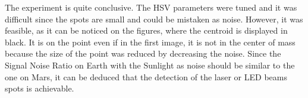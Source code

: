The experiment is quite conclusive. The HSV parameters were tuned and it was difficult since the spots are small and could be mistaken as noise. However, it was feasible, as it can be noticed on the figures, where the centroid is displayed in black. It is on the point even if in the first image, it is not in the center of mass because the size of the point was reduced by decreasing the noise. Since the Signal Noise Ratio on Earth with the Sunlight as noise should be similar to the one on Mars, it can be deduced that the detection of the laser or LED beams spots is achievable.